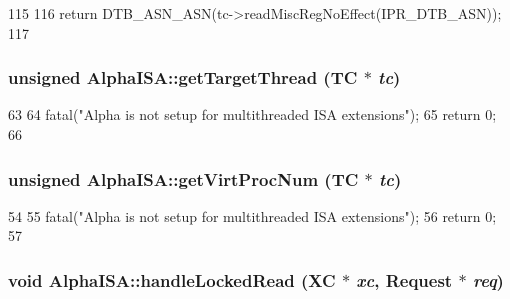 \begin{DoxyCode}
115 {
116     return DTB_ASN_ASN(tc->readMiscRegNoEffect(IPR_DTB_ASN));
117 }
\end{DoxyCode}
\hypertarget{namespaceAlphaISA_a7956606c6fe17700d24242789ae5002c}{
\subsubsection[{getTargetThread}]{\setlength{\rightskip}{0pt plus 5cm}unsigned AlphaISA::getTargetThread (TC $\ast$ {\em tc})}}
\label{namespaceAlphaISA_a7956606c6fe17700d24242789ae5002c}



\begin{DoxyCode}
63 {
64     fatal("Alpha is not setup for multithreaded ISA extensions");
65     return 0;
66 }
\end{DoxyCode}
\hypertarget{namespaceAlphaISA_a9f62368d1287f246b4026dfb6206bc4d}{
\subsubsection[{getVirtProcNum}]{\setlength{\rightskip}{0pt plus 5cm}unsigned AlphaISA::getVirtProcNum (TC $\ast$ {\em tc})}}
\label{namespaceAlphaISA_a9f62368d1287f246b4026dfb6206bc4d}



\begin{DoxyCode}
54 {
55     fatal("Alpha is not setup for multithreaded ISA extensions");
56     return 0;
57 }
\end{DoxyCode}
\hypertarget{namespaceAlphaISA_a00333a272d42606a01cc33c81999a58b}{
\subsubsection[{handleLockedRead}]{\setlength{\rightskip}{0pt plus 5cm}void AlphaISA::handleLockedRead (XC $\ast$ {\em xc}, \/  {\bf Request} $\ast$ {\em req})}}
\label{namespaceAlphaISA_a00333a272d42606a01cc33c81999a58b}



